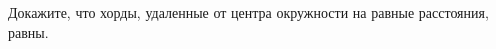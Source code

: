 \begin{ex}
	\begin{condition}
		Докажите, что хорды, удаленные от центра окружности на равные расстояния, равны.
	\end{condition}
\end{ex}